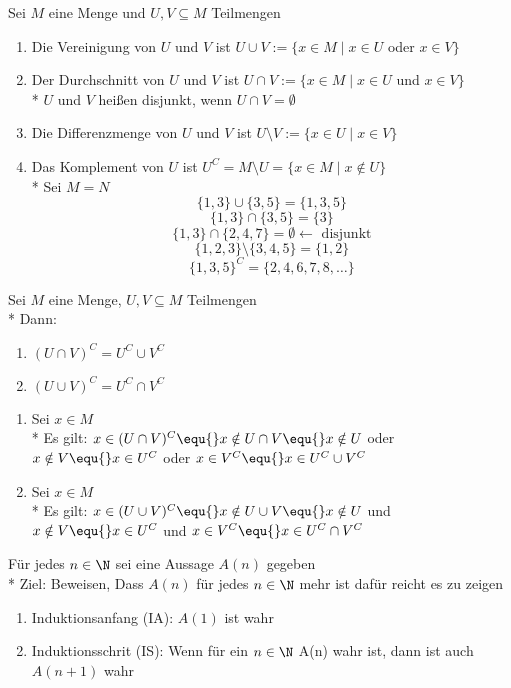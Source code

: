 Sei $M$ eine Menge und $U,V \subseteq M$ Teilmengen
\begin{enumerate}
\item Die Vereinigung von $U$ und $V$ ist $U \cup V := \{x \in M \mid x \in U$ oder $x \in V\}$
\item Der Durchschnitt von $U$ und $V$ ist $U \cap V := \{x \in M \mid x \in U$ und $x \in V\}$\\*
$U$ und $V$ heißen disjunkt, wenn $U \cap V = \emptyset$
\item Die Differenzmenge von $U$ und $V$ ist $U \setminus V := \{x \in U \mid x \in V\}$
\item Das Komplement von $U$ ist $U^C = M \setminus U = \{x \in M \mid x \notin U\}$\\*
%
\bsp
Sei $M = N$
$$\{1,3\} \cup \{3,5\} = \{1,3,5\}$$
$$\{1,3\} \cap \{3,5\} = \{3\}$$
$$\{1,3\} \cap \{2,4,7\} = \emptyset \leftarrow\text{ disjunkt}$$
$$\{1,2,3\} \setminus \{3,4,5\} = \{1,2\}$$
$$\{1,3,5\}^C = \{2,4,6,7,8,…\}$$
\end{enumerate}

Sei $M$ eine Menge, $U,V \subseteq M$ Teilmengen\\*
Dann:
\begin{enumerate}
\item $(U \cap V)^C = U^C \cup V^C$
\item $(U \cup V)^C = U^C \cap V^C$
\end{enumerate}
%
\bew
\begin{enumerate}
\item{Sei $x \in M$\\*
Es gilt: $x \in (U \cap V)^C \equ{} x \notin U \cap V \equ{} x \notin U$ oder $x \notin V\equ{} x \in U^C$ oder $x \in V^C \equ{} x\in U^C \cup V^C$}
\item{ Sei $x \in M$\\* Es gilt: $x \in (U \cup V)^C \equ{} x \notin U \cup V \equ{} x \notin U$ und $x \notin V\equ{} x \in U^C$ und $x \in V^C \equ{} x\in U^C \cap V^C$}
\end{enumerate}

Für jedes $n \in \N$ sei eine Aussage $A(n)$ gegeben\\*
Ziel: Beweisen, Dass $A(n)$ für jedes $n \in \N$ mehr ist dafür reicht es zu zeigen
\begin{enumerate}
\item{Induktionsanfang (IA): $A(1)$ ist wahr}
\item{Induktionsschrit (IS): Wenn für ein $n \in \N$ A(n) wahr ist, dann ist auch $A(n+1)$ wahr}
\end{enumerate}


